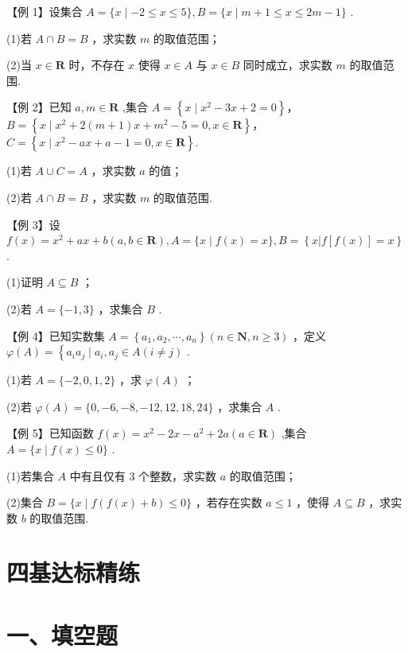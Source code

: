 【例 1】设集合 $A = \{ x \mid   - 2 \leq  x \leq  5\} ,B = \{ x \mid  m + 1 \leq  x \leq  {2m} - 1\}$ .

(1)若 $A \cap  B = B$ ，求实数 $m$ 的取值范围；

(2)当 $x \in  \mathbf{R}$ 时，不存在 $x$ 使得 $x \in  A$ 与 $x \in  B$ 同时成立，求实数 $m$ 的取值范围.

【例 2】已知 $a,m \in  \mathbf{R}$ ,集合 $A = \left\{  {x \mid  {x}^{2} - {3x} + 2 = 0}\right\} $，$B = \left\{  {x \mid  {x}^{2} + 2\left( {m + 1}\right) x + {m}^{2} - 5 = 0,x \in  \mathbf{R}}\right\} $，$C =  \left\{  {x \mid  {x}^{2} - {ax} + a - 1 = 0,x \in  \mathbf{R}}\right\}  .$

(1)若 $A \cup  C = A$ ，求实数 $a$ 的值；

(2)若 $A \cap  B = B$ ，求实数 $m$ 的取值范围.

【例 3】设 $f\left( x\right)  = {x}^{2} + {ax} + b\left( {a,b \in  \mathbf{R}}\right) ,A = \{ x \mid  f\left( x\right)  = x\} ,B = \left\{  {x\left| {f\left\lbrack  {f\left( x\right) }\right\rbrack   = x}\right. }\right\}$ .

(1)证明 $A \subseteq  B$ ；

(2)若 $A = \{  - 1,3\}$ ，求集合 $B$ .

【例 4】已知实数集 $A = \left\{  {{a}_{1},{a}_{2},\cdots ,{a}_{n}}\right\}  \left( {n \in  \mathbf{N},n \geq  3}\right)$ ，定义 $\varphi \left( A\right)  = \left\{  {{a}_{i}{a}_{j} \mid  {a}_{i},{a}_{j} \in  A\left( {i \neq  j}\right) }\right.$ .

(1)若 $A = \{  - 2,0,1,2\}$ ，求 $\varphi \left( A\right)$ ；

(2)若 $\varphi \left( A\right)  = \{ 0, - 6, - 8, - {12},{12},{18},{24}\}$ ，求集合 $A$ .

【例 5】已知函数 $f\left( x\right)  = {x}^{2} - {2x} - {a}^{2} + {2a}\left( {a \in  \mathbf{R}}\right)$ ,集合 $A = \{ x \mid  f\left( x\right)  \leq  0\}$ .

(1)若集合 $A$ 中有且仅有 3 个整数，求实数 $a$ 的取值范围；

(2)集合 $B = \{ x \mid  f\left( {f\left( x\right)  + b}\right)  \leq  0\}$ ，若存在实数 $a \leq  1$ ，使得 $A \subseteq  B$ ，求实数 $b$ 的取值范围.

\section*{四基达标精练}

\section*{一、填空题}

